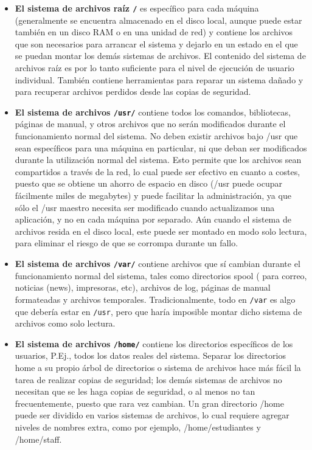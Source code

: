 \documentclass[12pt]{article}
\begin{document}
\begin{itemize} 
\item{ \textbf{El sistema de archivos raíz \texttt{/}} es específico para
cada máquina (generalmente se encuentra almacenado en el disco local, aunque
puede estar también en un disco RAM o en una unidad de red) y contiene los
archivos que son necesarios para arrancar el sistema y dejarlo en un estado en
el que se puedan montar los demás sistemas de archivos. El contenido del sistema
de archivos raíz es por lo tanto suficiente para el nivel de ejecución de
usuario individual. También contiene herramientas para reparar un sistema dañado
y para recuperar archivos perdidos desde las copias de seguridad.
}

\item{ \textbf{El sistema de archivos \texttt{/usr/}}  contiene todos los comandos,
bibliotecas, páginas de manual, y otros archivos que no serán modificados durante
el funcionamiento normal del sistema. No deben existir archivos bajo /usr que
sean específicos para una máquina en particular, ni que deban ser modificados
durante la utilización normal del sistema. Esto permite que los archivos sean
compartidos a través de la red, lo cual puede ser efectivo en cuanto a costes,
puesto que se obtiene un ahorro de espacio en disco (/usr puede ocupar
fácilmente miles de megabytes) y puede facilitar la administración, ya que sólo
el /usr maestro necesita ser modificado cuando actualizamos una aplicación, y no
en cada máquina por separado. Aún cuando el sistema de archivos resida en el
disco local, este puede ser montado en modo solo lectura, para eliminar el
riesgo de que se corrompa durante un fallo.  }

\item{  \textbf{El sistema de archivos \texttt{/var/}}  contiene
archivos que sí cambian durante el funcionamiento normal del sistema, tales como
directorios spool ( para correo, noticias (news), impresoras, etc), archivos de
log, páginas de manual formateadas y archivos temporales.  Tradicionalmente,
todo en \texttt{/var} es algo que debería estar en
\texttt{/usr}, pero que haría imposible montar dicho
sistema de archivos como solo lectura. }

\item{ \textbf{El sistema de archivos \texttt{/home/}}  contiene los directorios
específicos de los usuarios, P.Ej., todos los datos reales del sistema. Separar
los directorios home a su propio árbol de directorios o sistema de archivos hace
más fácil la tarea de realizar copias de seguridad; los demás sistemas de
archivos no necesitan que se les haga copias de seguridad, o al menos no tan
frecuentemente, puesto que  rara vez cambian. Un gran directorio /home puede ser
dividido en varios sistemas de archivos, lo cual requiere agregar niveles de
nombres extra, como por ejemplo, /home/estudiantes y /home/staff.
}
\end{itemize}
\end{document}
